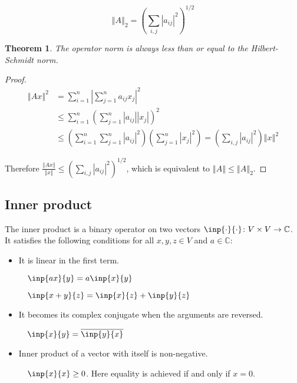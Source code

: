 \documentclass[twofold]{article}
\newcommand*\conj[1]{\overline{#1}}
\newcommand*\norm[1]{\left \Vert #1 \right\Vert}
\newcommand*\abs[1]{\left \vert #1 \right\vert}
\theoremstyle{plain}
\newtheorem{theorem}{Theorem}
\theoremstyle{definition}
\theoremstyle{remark}
\begin{document}
 \[\norm{A}_2 = \left( \sum_{i, j} \abs{a_{ij}}^2 \right) ^{1/2}\]


\begin{theorem} The operator norm is always less than or equal to the Hilbert-Schmidt norm. \end{theorem}

\begin{proof}
 \begin{equation*} \begin{split} 
\norm{Ax}^2 & = \sum_{i = 1} ^ n \abs{\sum_{j = 1} ^ n a_{ij} x_j}^2 \\
& \le  \sum_{i = 1} ^ n \left( \sum_{j = 1} ^ n \abs{a_{ij}} \abs{ x_j}\right) ^2 \\
& \le \left( \sum_{i = 1}^n \sum_{j = 1}^n \abs{a_{ij}}^2\right) \left( \sum_{j=1}^n \abs{x_j}^2 \right)  = \left( \sum_{i, j} \abs{a_{ij}}^2 \right) \norm{x}^2
\end{split}
\end{equation*} 

Therefore \(\displaystyle \frac{\norm{Ax}}{\norm{x}} \le \left( \sum_{i, j} \abs{a_{ij}}^2 \right) ^{1/2}\), which is equivalent to \(\norm{A} \le \norm{A}_2\).
\end{proof}



\subsection{Inner product}

The inner product is a binary operator on two vectors \(\inp{\cdot}{\cdot} \colon V  \times  V \to \mathbb{C}\). It  satisfies the following conditions for all \(x, y, z \in V\) and \(a \in \mathbb{C}\):

\begin{itemize}
\item It is linear in the first term. 

\(\quad \inp{ax}{y} = a \inp{x}{y}\)
 
\(\quad \inp{x + y}{z} = \inp{x}{z} + \inp{y}{z}\)

\item It becomes its complex conjugate when the arguments are reversed.

\(\quad \inp{x}{y} = \conj{\inp{y}{x}}\)

\item Inner product of a vector with itself is non-negative. 

\(\quad \inp{x}{x} \ge 0\). Here equality is achieved if and only if \(x = 0\).
\end{itemize}
\end{document}
